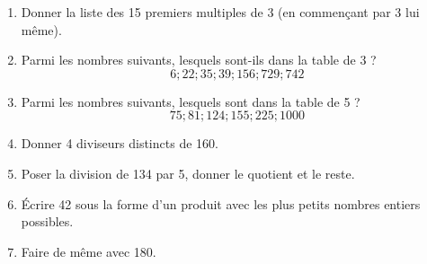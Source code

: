 \documentclass[a4paper]{book}
\begin{document}
\medskip

\setcounter{exo}{1}

    \begin{exercice}
        \begin{enumerate}[leftmargin=*]
            \item Donner la liste des 15 premiers multiples de 3 (en commençant par 3 lui même).

            \item Parmi les nombres suivants, lesquels sont-ils dans la table de 3 ?
            \[6; 22; 35; 39; 156; 729; 742\]

            \item Parmi les nombres suivants, lesquels sont dans la table de 5 ?
            \[75; 81; 124; 155; 225; 1000\]

            \item Donner 4 diviseurs distincts de 160.

            \item Poser la division de 134 par 5, donner le quotient et le reste.

            \item Écrire 42 sous la forme d'un produit avec les plus petits nombres entiers possibles.

            \item Faire de même avec 180.
        \end{enumerate}
    \end{exercice}
\end{document}

